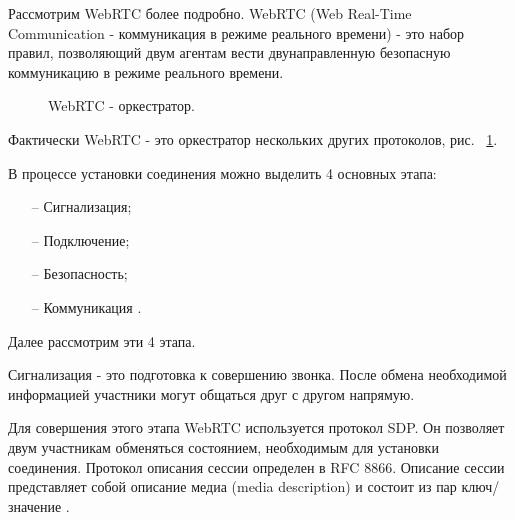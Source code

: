 
Рассмотрим WebRTC более подробно. WebRTC (Web Real-Time Communication - коммуникация в режиме реального времени) - это набор правил, позволяющий двум агентам вести двунаправленную безопасную коммуникацию в режиме реального времени.

\begin{figure}[ht]
\begin{center}

\caption{
\label{webrtc-orchestrator}
     WebRTC - оркестратор.}
\end {center}
\end {figure}

Фактически WebRTC - это оркестратор нескольких других протоколов, рис. ~\ref{webrtc-orchestrator}.

В процессе установки соединения можно выделить 4 основных этапа:
\begin{itemize}
	\item[--] Сигнализация;
	\item[--] Подключение;
        \item[--] Безопасность;
        \item[--] Коммуникация \cite{v3}.
\end{itemize}

Далее рассмотрим эти 4 этапа.


Сигнализация - это подготовка к совершению звонка. После обмена необходимой информацией участники могут общаться друг с другом напрямую.

Для совершения этого этапа WebRTC используется протокол SDP. Он позволяет двум участникам обменяться состоянием, необходимым для установки соединения. Протокол описания сессии определен в RFC 8866. Описание сессии представляет собой описание медиа (media description) и состоит из пар ключ/значение \cite{v21}.

